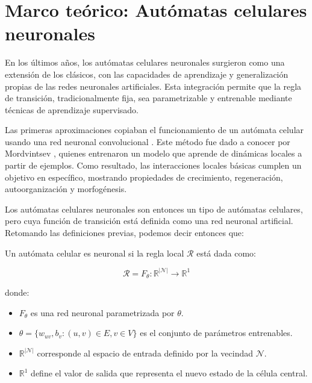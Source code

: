 \chapter{Marco teórico: Autómatas celulares neuronales}

En los últimos años, los autómatas celulares neuronales surgieron como una extensión de los clásicos, con las capacidades de aprendizaje y generalización propias de las redes neuronales artificiales. Esta integración permite que la regla de transición, tradicionalmente fija, sea parametrizable y entrenable mediante técnicas de aprendizaje supervisado.

Las primeras aproximaciones copiaban el funcionamiento de un autómata celular usando una red neuronal convolucional \cite{gilpinNCA}. Este método fue dado a conocer por Mordvintsev \cite{mordvintsevNCA}, quienes entrenaron un modelo que aprende de dinámicas locales a partir de ejemplos. Como resultado, las interacciones locales básicas cumplen un objetivo en específico, mostrando propiedades de crecimiento, regeneración, autoorganización y morfogénesis.

Los autómatas celulares neuronales son entonces un tipo de autómatas celulares, pero cuya función de transición está definida como una red neuronal artificial. Retomando las definiciones previas, podemos decir entonces que:

\begin{definition}
	
	Un autómata celular es neuronal si la regla local $\mathcal{R}$ está dada como:
	
	\[
	\mathcal{R} = F_\theta: \mathbb{R}^{|\mathcal{N}|} \to \mathbb{R}^1
	\]
	
	donde:
	
	\begin{itemize}
		
		\item $F_\theta$ es una red neuronal parametrizada por $\theta$.
		
		\item $ \theta = \{ w_{uv}, b_v : (u, v) \in E, v \in V \}$ es el conjunto de parámetros entrenables.
		
		\item $\mathbb{R}^{|\mathcal{N}|}$ corresponde al espacio de entrada definido por la vecindad $\mathcal{N}$.
		
		\item $\mathbb{R}^1$ define el valor de salida que representa el nuevo estado de la célula central.
		
	\end{itemize}
	
\end{definition}

